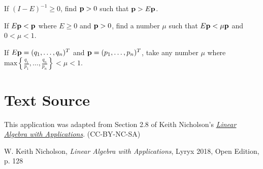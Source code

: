 \documentclass{ximera}
\begin{document}
\begin{problem}\label{ex:ex2_8_11}
If $(I - E)^{-1} \geq 0$, find ${\bf p} > 0$ such that ${\bf p} > E{\bf p}$.
\end{problem}

\begin{problem}\label{ex:ex2_8_12}
If $E{\bf p} < {\bf p}$ where $E \geq 0$ and ${\bf p} > 0$, find a number $\mu$ such that $E{\bf p} < \mu{\bf p}$ and $0 < \mu < 1$.

\begin{hint}
If $E{\bf p} = (q_{1}, \dots, q_{n})^{T}$ and ${\bf p} = (p_{1}, \dots, p_{n})^{T}$, take any number $\mu$ where $\mbox{max}\left\lbrace \frac{q_{1}}{p_{1}}, \dots, \frac{q_{n}}{p_{n}} \right\rbrace < \mu < 1$.
\end{hint}

\end{problem}

\section*{Text Source} This application was adapted from Section 2.8 of Keith Nicholson's \href{https://open.umn.edu/opentextbooks/textbooks/linear-algebra-with-applications}{\it Linear Algebra with Applications}. (CC-BY-NC-SA)

W. Keith Nicholson, {\it Linear Algebra with Applications}, Lyryx 2018, Open Edition, p. 128 




\end{document}
